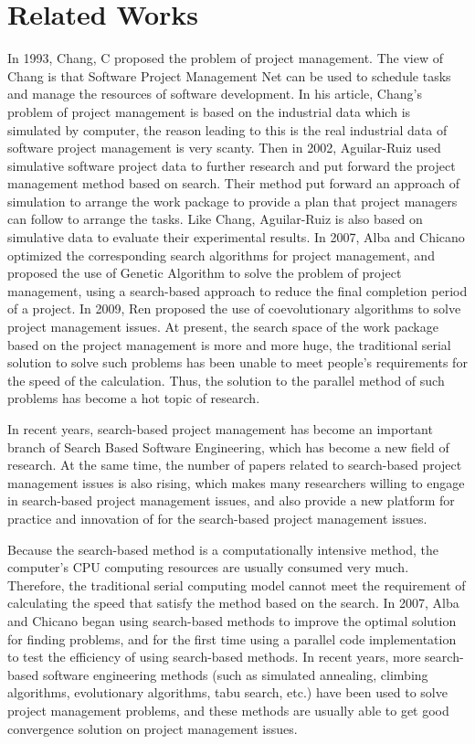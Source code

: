 
\section{Related Works}
%

In 1993, Chang, C proposed the problem of project management. The view of 
Chang is that Software Project Management Net can be used to schedule tasks 
and manage the resources of software development. In his article, Chang's 
problem of project management is based on the industrial data which is 
simulated by computer, the reason leading to this is the real industrial data 
of software project management is very scanty. Then in 2002, Aguilar-Ruiz 
used simulative software project data to further research and put forward the 
project management method based on search. Their method put forward an 
approach of simulation to arrange the work package to provide a plan that 
project managers can follow to arrange the tasks\cite{alba}. Like Chang, 
Aguilar-Ruiz is also based on simulative data to evaluate their experimental
results. In 2007, Alba and Chicano optimized the corresponding search algorithms
for project management, and proposed the use of Genetic Algorithm to solve the 
problem of project management, using a search-based approach to reduce the 
final completion period of a project. In 2009, Ren proposed the use of 
coevolutionary algorithms to solve project management issues\cite{ren}. At 
present, the search space of the work package based on the project management
is more and more huge, the traditional serial solution to solve such problems
has been unable to meet people's requirements for the speed of the calculation. 
Thus, the solution to the parallel method of such problems has become a hot 
topic of research\cite{pentico}.

In recent years, search-based project management has become an important 
branch of Search Based Software Engineering, which has become a new field of 
research. At the same time, the number of papers related to search-based 
project management issues is also rising, which makes many researchers 
willing to engage in search-based project management issues, and also provide 
a new platform for practice and innovation of for the search-based project 
management issues\cite{penta}.

Because the search-based method is a computationally intensive method, the 
computer's CPU computing resources are usually consumed very much. Therefore, 
the traditional serial computing model cannot meet the requirement of 
calculating the speed that satisfy the method based on the search. In 2007, 
Alba and Chicano began using search-based methods to improve the optimal 
solution for finding problems, and for the first time using a parallel code 
implementation to test the efficiency of using search-based methods\cite{pospichal}.
In recent years, more search-based software engineering methods (such as 
simulated annealing, climbing algorithms, evolutionary algorithms, tabu 
search, etc.) have been used to solve project management problems, and these 
methods are usually able to get good convergence solution on project 
management issues.

